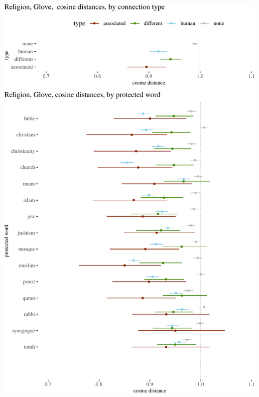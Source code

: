 \documentclass{clv3}
\begin{document}
\begin{center}\includegraphics[width=1\linewidth]{figures/resultsReligionGlovea} \end{center}
\end{document}

